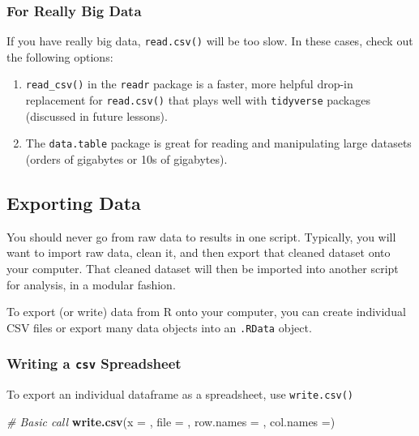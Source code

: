 \documentclass[
]{book}
\newenvironment{Shaded}{\begin{snugshade}}{\end{snugshade}}
\newcommand{\CommentTok}[1]{\textcolor[rgb]{0.56,0.35,0.01}{\textit{#1}}}
\newcommand{\DataTypeTok}[1]{\textcolor[rgb]{0.13,0.29,0.53}{#1}}
\newcommand{\KeywordTok}[1]{\textcolor[rgb]{0.13,0.29,0.53}{\textbf{#1}}}
\newcommand{\NormalTok}[1]{#1}
\providecommand{\tightlist}{%
  \setlength{\itemsep}{0pt}\setlength{\parskip}{0pt}}
\begin{document}
\hypertarget{for-really-big-data}{%
\subsubsection*{For Really Big Data}\label{for-really-big-data}}

If you have really big data, \texttt{read.csv()} will be too slow. In these cases, check out the following options:

\begin{enumerate}
\def\labelenumi{\arabic{enumi})}
\tightlist
\item
  \texttt{read\_csv()} in the \texttt{readr} package is a faster, more helpful drop-in replacement for \texttt{read.csv()} that plays well with \texttt{tidyverse} packages (discussed in future lessons).
\item
  The \texttt{data.table} package is great for reading and manipulating large datasets (orders of gigabytes or 10s of gigabytes).
\end{enumerate}

\hypertarget{exporting-data}{%
\subsection{Exporting Data}\label{exporting-data}}

You should never go from raw data to results in one script. Typically, you will want to import raw data, clean it, and then export that cleaned dataset onto your computer. That cleaned dataset will then be imported into another script for analysis, in a modular fashion.

To export (or write) data from R onto your computer, you can create individual CSV files or export many data objects into an \texttt{.RData} object.

\hypertarget{writing-a-csv-spreadsheet}{%
\subsubsection*{\texorpdfstring{Writing a \texttt{csv} Spreadsheet}{Writing a csv Spreadsheet}}\label{writing-a-csv-spreadsheet}}

To export an individual dataframe as a spreadsheet, use \texttt{write.csv()}

\begin{Shaded}
\begin{Highlighting}[]
\CommentTok{# Basic call}
\KeywordTok{write.csv}\NormalTok{(}\DataTypeTok{x =}\NormalTok{ , }\DataTypeTok{file =}\NormalTok{ , }\DataTypeTok{row.names =}\NormalTok{ , }\DataTypeTok{col.names =}\NormalTok{)}
\end{Highlighting}
\end{Shaded}
\end{document}

